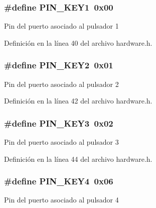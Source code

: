 \subsubsection[{\texorpdfstring{P\+I\+N\+\_\+\+K\+E\+Y1}{PIN_KEY1}}]{\setlength{\rightskip}{0pt plus 5cm}\#define P\+I\+N\+\_\+\+K\+E\+Y1~0x00}\hypertarget{group__hardware_ga332cf72d49bf86b7b20274f3dec99d7b}{}\label{group__hardware_ga332cf72d49bf86b7b20274f3dec99d7b}
Pin del puerto asociado al pulsador 1 

Definición en la línea 40 del archivo hardware.\+h.

\subsubsection[{\texorpdfstring{P\+I\+N\+\_\+\+K\+E\+Y2}{PIN_KEY2}}]{\setlength{\rightskip}{0pt plus 5cm}\#define P\+I\+N\+\_\+\+K\+E\+Y2~0x01}\hypertarget{group__hardware_gae87128e49906c97fa9d6b438a08c1221}{}\label{group__hardware_gae87128e49906c97fa9d6b438a08c1221}
Pin del puerto asociado al pulsador 2 

Definición en la línea 42 del archivo hardware.\+h.

\subsubsection[{\texorpdfstring{P\+I\+N\+\_\+\+K\+E\+Y3}{PIN_KEY3}}]{\setlength{\rightskip}{0pt plus 5cm}\#define P\+I\+N\+\_\+\+K\+E\+Y3~0x02}\hypertarget{group__hardware_gaec621d9712815696a7bd342db8b2ff06}{}\label{group__hardware_gaec621d9712815696a7bd342db8b2ff06}
Pin del puerto asociado al pulsador 3 

Definición en la línea 44 del archivo hardware.\+h.

\subsubsection[{\texorpdfstring{P\+I\+N\+\_\+\+K\+E\+Y4}{PIN_KEY4}}]{\setlength{\rightskip}{0pt plus 5cm}\#define P\+I\+N\+\_\+\+K\+E\+Y4~0x06}\hypertarget{group__hardware_gaf59a027359301b6e2229f7068c36efe6}{}\label{group__hardware_gaf59a027359301b6e2229f7068c36efe6}
Pin del puerto asociado al pulsador 4 

